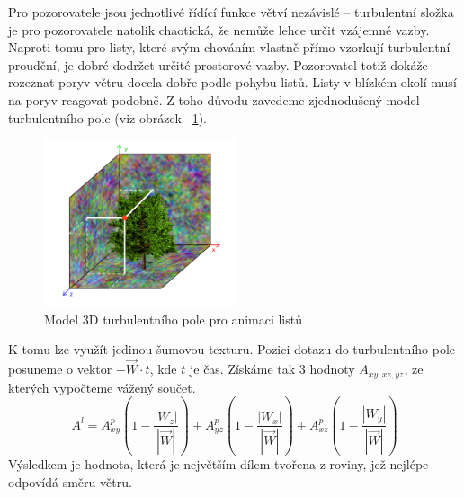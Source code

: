 \pagebreak
Pro pozorovatele jsou jednotlivé řídící funkce větví nezávislé – turbulentní složka je pro pozorovatele natolik chaotická, že nemůže lehce určit vzájemné vazby. Naproti tomu pro listy, které svým chováním vlastně přímo vzorkují turbulentní proudění, je dobré dodržet určité prostorové vazby. Pozorovatel totiž dokáže rozeznat poryv větru docela dobře podle pohybu listů. Listy v blízkém okolí musí na poryv reagovat podobně. Z toho důvodu zavedeme zjednodušený model turbulentního pole (viz obrázek ~\ref{fig:TurbulentFieldModel}). 
\begin{figure}[!hbt]
\begin{center}
\includegraphics[width=0.5\textwidth]{./figures/turbulentField.png}
\caption[Model 3D turbulentního pole]%
{Model 3D turbulentního pole pro animaci listů\label{fig:TurbulentFieldModel}}
\end{center}

\end{figure}

 K tomu lze využít jedinou šumovou texturu. Pozici dotazu do turbulentního pole posuneme o vektor $-\vec{W} \cdot t$, kde $t$ je čas. Získáme tak 3 hodnoty $A_{xy,xz,yz}$, ze kterých vypočteme vážený součet. 
\begin{equation}
 A^{l} = A^p_{xy}(1-\frac{\left | W_z\right |}{\left | \vec{W}\right |})
+ A^p_{yz}(1-\frac{\left | W_x\right |}{\left | \vec{W}\right |}) +
A^p_{xz}(1-\frac{\left | W_y\right |}{\left | \vec{W}\right |})
\end{equation}
Výsledkem je hodnota, která je největším dílem tvořena z roviny, jež nejlépe odpovídá směru větru.








